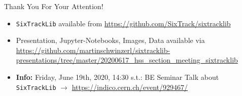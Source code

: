 \documentclass{beamer}
\begin{document}
\begin{frame}{Thank You For Your Attention!}
\begin{itemize}
    
    \item \texttt{SixTrackLib} available from \url{https://github.com/SixTrack/sixtracklib}\\[1em]
    
    \item Presentation, Jupyter-Notebooks, Images, Data available via 
    \url{https://github.com/martinschwinzerl/sixtracklib-presentations/tree/master/20200617_hss_section_meeting_sixtracklib}\\[1em]
          
    \item \textbf{Info:} Friday, June 19th, 2020, 14:30 s.t.: BE Seminar Talk about \texttt{SixTrackLib} $\longrightarrow$ \url{https://indico.cern.ch/event/929467/}\\[1em]
    
\end{itemize}
\end{frame}
\end{document}
